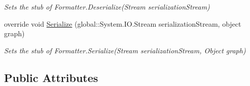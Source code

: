 \begin{DoxyCompactItemize}
\begin{DoxyCompactList}\small\item\em Sets the stub of Formatter.\-Deserialize(\-Stream serialization\-Stream)\end{DoxyCompactList}\item 
override void \hyperlink{class_system_1_1_runtime_1_1_serialization_1_1_fakes_1_1_stub_formatter_a1d0cddef6246bff80ca0adf520a6af39}{Serialize} (global\-::\-System.\-I\-O.\-Stream serialization\-Stream, object graph)
\begin{DoxyCompactList}\small\item\em Sets the stub of Formatter.\-Serialize(\-Stream serialization\-Stream, Object graph)\end{DoxyCompactList}\end{DoxyCompactItemize}
\subsection*{Public Attributes}
